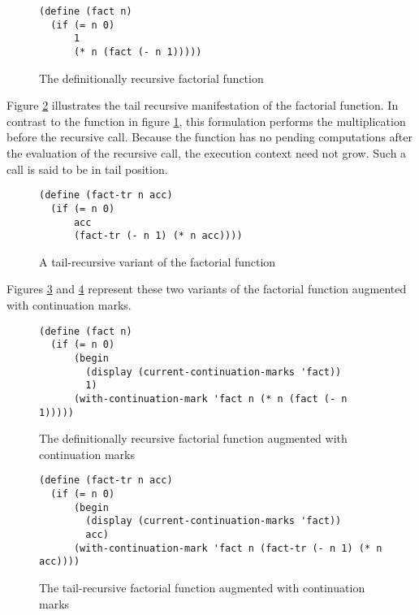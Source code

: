 \documentclass[ms]{byuprop}
\newcounter{definition}
\begin{document}
\begin{figure}
\begin{verbatim}
(define (fact n)
  (if (= n 0)
      1
      (* n (fact (- n 1)))))
\end{verbatim}
\caption{The definitionally recursive factorial function}
\label{fac-rec}
\end{figure}

Figure \ref{fac-tail-rec} illustrates the tail recursive manifestation of the factorial
function. In contrast to the function in figure \ref{fac-rec}, this formulation performs
the multiplication before the recursive call. Because the function has no pending
computations after the evaluation of the recursive call, the execution context need not
grow. Such a call is said to be in tail position.

\begin{figure}
\begin{verbatim}
(define (fact-tr n acc)
  (if (= n 0)
      acc
      (fact-tr (- n 1) (* n acc))))
\end{verbatim}
\caption{A tail-recursive variant of the factorial function}
\label{fac-tail-rec}
\end{figure}

Figures \ref{fac-rec-cm} and \ref{fac-tail-rec-cm} represent these two variants of the
factorial function augmented with continuation marks.


\begin{figure}
\begin{verbatim}
(define (fact n)
  (if (= n 0)
      (begin
        (display (current-continuation-marks 'fact))
        1)
      (with-continuation-mark 'fact n (* n (fact (- n 1)))))
\end{verbatim}
\caption{The definitionally recursive factorial function augmented with continuation marks}
\label{fac-rec-cm}
\end{figure}

\begin{figure}
\begin{verbatim}
(define (fact-tr n acc)
  (if (= n 0)
      (begin
        (display (current-continuation-marks 'fact))
        acc)
      (with-continuation-mark 'fact n (fact-tr (- n 1) (* n acc))))
\end{verbatim}
\caption{The tail-recursive factorial function augmented with continuation marks}
\label{fac-tail-rec-cm}
\end{figure}
\end{document}
